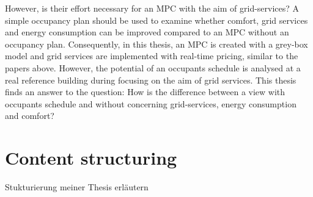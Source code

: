     However, is their effort necessary for an MPC with the aim of grid-services? A simple occupancy plan should be used to examine whether comfort, grid services and energy consumption can be improved compared to an MPC without an occupancy plan. Consequently, in this thesis, an MPC is created with a grey-box model and grid services are implemented with real-time pricing, similar to the papers above. However, the potential of an occupants schedule is analysed at a real reference building during focusing on the aim of grid services. This thesis finds an answer to the question: How is the difference between a view with occupants schedule and without concerning grid-services, energy consumption and comfort? 

 




\section{Content structuring}
\label{section:contentstructuring}
Stukturierung meiner Thesis erläutern